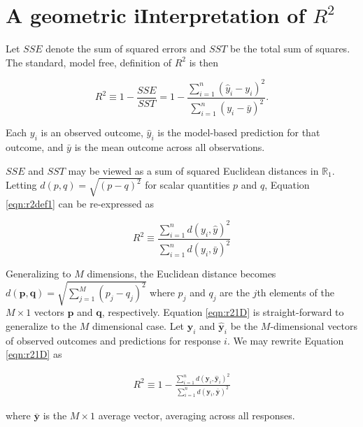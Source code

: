 \hypertarget{a-geometric-iinterpretation-of-r2}{%
\section{\texorpdfstring{A geometric iInterpretation of \(R^2\)}{A geometric iInterpretation of R\^{}2}}\label{a-geometric-iinterpretation-of-r2}}

Let \(SSE\) denote the sum of squared errors and \(SST\) be the total sum of squares. The standard, model free, definition of \(R^2\) is then

\begin{equation}
\label{eqn:r2def1}
R^2 
\equiv 1 - \frac{SSE}{SST} = 1 - 
\frac{\sum_{i=1}^n{(\hat{y}_i-y_i)^2}}{\sum_{i=1}^n{(y_i-\bar{y})^2}}.
\end{equation}

Each \(y_i\) is an observed outcome, \(\hat{y}_i\) is the model-based prediction for that outcome, and \(\bar{y}\) is the mean outcome across all observations.

\(SSE\) and \(SST\) may be viewed as a sum of squared Euclidean distances in \(\mathbb{R}_1\). Letting \(d(p,q) = \sqrt{(p - q)^2}\) for scalar quantities \(p\) and \(q\), Equation \eqref{eqn:r2def1} can be re-expressed as

\begin{equation}
\label{eqn:r21D}
    R^2 
    \equiv 
    \frac{\sum_{i=1}^n{d(y_i, \hat{y})^2}}{\sum_{i=1}^n{d(y_i,\bar{y})^2}}
\end{equation}

Generalizing to \(M\) dimensions, the Euclidean distance becomes \(d(\boldsymbol{p},\boldsymbol{q}) = \sqrt{\sum_{j=1}^M(p_j - q_j)^2}\) where \(p_j\) and \(q_j\) are the \(j\)th elements of the \(M \times 1\) vectors \(\boldsymbol{p}\) and \(\boldsymbol{q}\), respectively. Equation \eqref{eqn:r21D} is straight-forward to generalize to the \(M\) dimensional case. Let \(\boldsymbol{y}_i\) and \(\hat{\boldsymbol{y}}_i\) be the \(M\)-dimensional vectors of observed outcomes and predictions for response \(i\). We may rewrite Equation \eqref{eqn:r21D} as

\begin{align}
\label{eqn:r2def2}
    R^2 \equiv 
        1 - \frac{\sum_{i=1}^n d(\boldsymbol{y}_i,\hat{\boldsymbol{y}}_i)^2}{\sum_{i=1}^n d(\boldsymbol{y}_i,\bar{\boldsymbol{y}})^2}
\end{align}

where \(\bar{\boldsymbol{y}}\) is the \(M\times 1\) average vector, averaging across all responses.


